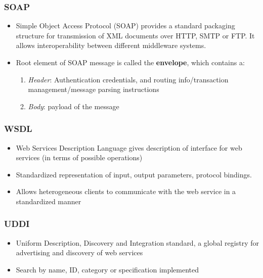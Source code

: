 \documentclass{article}
\begin{document}
\subsubsection{SOAP}
\begin{itemize}
    \item Simple Object Access Protocol (SOAP) provides a standard packaging structure for transmission of XML documents over HTTP, SMTP or FTP. It allows interoperability between different middleware systems.
    
    \item Root element of SOAP message is called the \textbf{envelope}, which contains a:
    \begin{enumerate}
        \item \textit{Header}: Authentication credentials, and routing info/transaction management/message parsing instructions
        
        \item \textit{Body}: payload of the message
    \end{enumerate}
\end{itemize}

\subsubsection{WSDL}
\begin{itemize}
    \item Web Services Description Language gives description of interface for web services (in terms of possible operations)
    
    \item Standardized representation of input, output parameters, protocol bindings.
    
    \item Allows heterogeneous clients to communicate with the web service in a standardized manner
\end{itemize}

\subsubsection{UDDI}
\begin{itemize}
    \item Uniform Description, Discovery and Integration standard, a global registry for advertising and discovery of web services
    
    \item Search by name, ID, category or specification implemented
\end{itemize}
\end{document}
